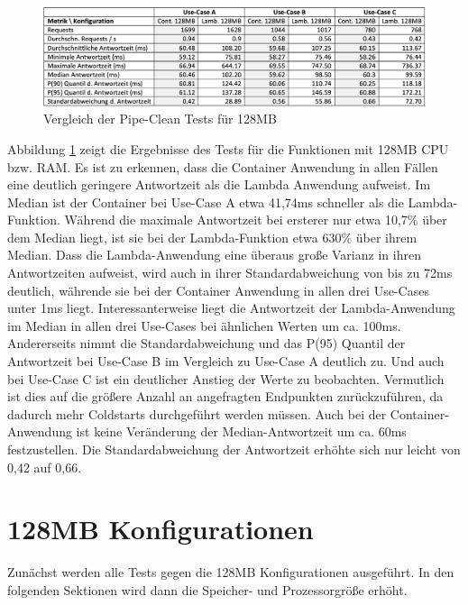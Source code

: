 \begin{figure}[H]
    \includegraphics[width=\textwidth]{img/pipe128-comparison.png}
    \caption[Vergleich der Pipe-Clean Tests für 128MB]{Vergleich der Pipe-Clean Tests für 128MB}
    \label{fig:pipe128-comparison}
\end{figure}

Abbildung \ref{fig:pipe128-comparison} zeigt die Ergebnisse des Tests für die Funktionen mit 128MB CPU bzw. RAM. Es ist zu erkennen, dass die Container Anwendung in allen Fällen eine deutlich geringere Antwortzeit als die Lambda Anwendung aufweist. Im Median ist der Container bei Use-Case A etwa 41,74ms schneller als die Lambda-Funktion. Während die maximale Antwortzeit bei ersterer nur etwa 10,7\% über dem Median liegt, ist sie bei der Lambda-Funktion etwa 630\% über ihrem Median. Dass die Lambda-Anwendung eine überaus große Varianz in ihren Antwortzeiten aufweist, wird auch in ihrer Standardabweichung von bis zu 72ms deutlich, währende sie bei der Container Anwendung in allen drei Use-Cases unter 1ms liegt. Interessanterweise liegt die Antwortzeit der Lambda-Anwendung im Median in allen drei Use-Cases bei ähnlichen Werten um ca. 100ms. Andererseits nimmt die Standardabweichung und das P(95) Quantil der Antwortzeit bei Use-Case B im Vergleich zu Use-Case A deutlich zu. Und auch bei Use-Case C ist ein deutlicher Anstieg der Werte zu beobachten. Vermutlich ist dies auf die größere Anzahl an angefragten Endpunkten zurückzuführen, da dadurch mehr Coldstarts durchgeführt werden müssen. Auch bei der Container-Anwendung ist keine Veränderung der Median-Antwortzeit um ca. 60ms festzustellen. Die Standardabweichung der Antwortzeit erhöhte sich nur leicht von 0,42 auf 0,66.

\section{128MB Konfigurationen}
Zunächst werden alle Tests gegen die 128MB Konfigurationen ausgeführt. In den folgenden Sektionen wird dann die Speicher- und Prozessorgröße erhöht. 

